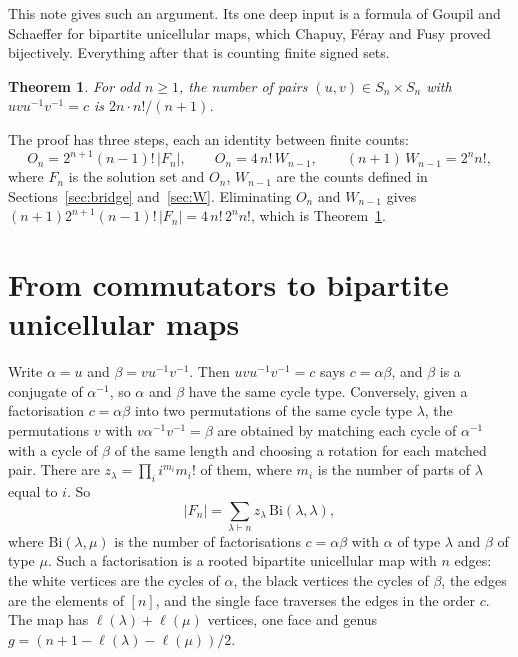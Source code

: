\documentclass[11pt]{amsart}
\newtheorem{theorem}{Theorem}
\theoremstyle{remark}
\newcommand{\Bi}{\mathrm{Bi}}
\begin{document}
This note gives such an argument. Its one deep input is a formula of Goupil and Schaeffer \cite{GS} for bipartite
unicellular maps, which Chapuy, F\'eray and Fusy \cite{CFF} proved bijectively. Everything after that is counting
finite signed sets.

\begin{theorem}\label{thm:main}
For odd $n\ge1$, the number of pairs $(u,v)\in S_n\times S_n$ with $uvu^{-1}v^{-1}=c$ is $2n\cdot n!/(n+1)$.
\end{theorem}

The proof has three steps, each an identity between finite counts:
\begin{equation}\label{eq:three}
  O_n=2^{n+1}(n-1)!\,|F_n|,\qquad O_n=4\,n!\,W_{n-1},\qquad (n+1)\,W_{n-1}=2^n n!,
\end{equation}
where $F_n$ is the solution set and $O_n$, $W_{n-1}$ are the counts defined in Sections~\ref{sec:bridge}
and~\ref{sec:W}. Eliminating $O_n$ and $W_{n-1}$ gives $(n+1)2^{n+1}(n-1)!\,|F_n|=4\,n!\,2^n n!$, which is
Theorem~\ref{thm:main}.

\section{From commutators to bipartite unicellular maps}

Write $\alpha=u$ and $\beta=vu^{-1}v^{-1}$. Then $uvu^{-1}v^{-1}=c$ says $c=\alpha\beta$, and $\beta$ is a conjugate of
$\alpha^{-1}$, so $\alpha$ and $\beta$ have the same cycle type. Conversely, given a factorisation $c=\alpha\beta$
into two permutations of the same cycle type $\lambda$, the permutations $v$ with $v\alpha^{-1}v^{-1}=\beta$ are
obtained by matching each cycle of $\alpha^{-1}$ with a cycle of $\beta$ of the same length and choosing a rotation
for each matched pair. There are $z_\lambda=\prod_i i^{m_i}m_i!$ of them, where $m_i$ is the number of parts of
$\lambda$ equal to $i$. So
\begin{equation}\label{eq:zBi}
  |F_n|=\sum_{\lambda\vdash n} z_\lambda\,\Bi(\lambda,\lambda),
\end{equation}
where $\Bi(\lambda,\mu)$ is the number of factorisations $c=\alpha\beta$ with $\alpha$ of type $\lambda$ and $\beta$ of
type $\mu$. Such a factorisation is a rooted bipartite unicellular map with $n$ edges: the white vertices are the
cycles of $\alpha$, the black vertices the cycles of $\beta$, the edges are the elements of $[n]$, and the single face
traverses the edges in the order $c$. The map has $\ell(\lambda)+\ell(\mu)$ vertices, one face and genus
$g=(n+1-\ell(\lambda)-\ell(\mu))/2$.
\end{document}
